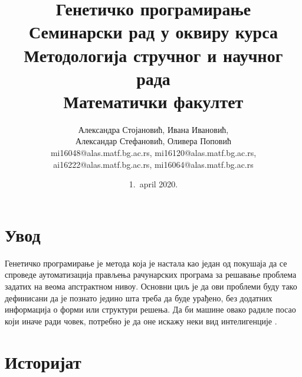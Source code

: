 \documentclass[a4paper]{article}
\begin{document}
\title{Генетичко програмирање\\ \small{Семинарски рад у оквиру курса\\Методологија стручног и научног рада\\ Математички факултет}}

\author{Александра Стојановић, Ивана Ивановић,\\ Александар Стефановић, Оливера Поповић\\ mi16048@alas.matf.bg.ac.rs, mi16120@alas.matf.bg.ac.rs,\\ ai16222@alas.matf.bg.ac.rs, mi16064@alas.matf.bg.ac.rs}

\date{1.~april 2020.}

\maketitle


\tableofcontents

\newpage

\section{Увод}

Генетичко програмирање је метода која је настала као један од покушаја да се спроведе аутоматизација прављења рачунарских програма за решавање проблема задатих на веома апстрактном нивоу. Основни циљ је да ови проблеми буду тако дефинисани да је познато једино шта треба да буде урађено, без додатних информација о форми или структури решења. Да би машине овако радиле посао који иначе ради човек, потребно је да оне искажу неки вид интелигенције \cite{turing}.


\section{Историјат}
\end{document}
